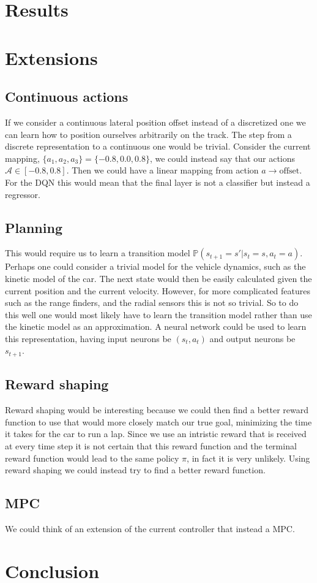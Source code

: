\documentclass{article}
\begin{document}
\section{Results}

\section{Extensions}

\subsection{Continuous actions}

If we consider a continuous lateral position offset instead of a discretized one we can learn how to position ourselves arbitrarily on the track. The step from a discrete representation to a continuous one would be trivial. Consider the current mapping, $\{a_1,a_2,a_3\} = \{-0.8, 0.0, 0.8\}$, we could instead say that our actions $\mathcal{A} \in [-0.8,0.8]$. Then we could have a linear mapping from action $a \rightarrow \text{offset}$. For the DQN this would mean that the final layer is not a classifier but instead a regressor.

\subsection{Planning}

This would require us to learn a transition model  $\mathbb{P}(s_{t+1}=s'|s_t=s,a_t=a)$. Perhaps one could consider a trivial model for the vehicle dynamics, such as the kinetic model of the car. The next state would then be easily calculated given the current position and the current velocity. However, for more complicated features such as the range finders, and the radial sensors this is not so trivial. So to do this well one would most likely have to learn the transition model rather than use the kinetic model as an approximation. A neural network could be used to learn this representation, having input neurons be $(s_t,a_t)$ and output neurons be $s_{t+1}$.

\subsection{Reward shaping}

Reward shaping would be interesting because we could then find a better reward function to use that would more closely match our true goal, minimizing the time it takes for the car to run a lap. Since we use an intristic reward that is received at every time step it is not certain that this reward function and the terminal reward function would lead to the same policy $\pi$, in fact it is very unlikely. Using reward shaping we could instead try to find a better reward function.

\subsection{MPC}

We could think of an extension of the current controller that instead a MPC.

\section{Conclusion}
\end{document}
